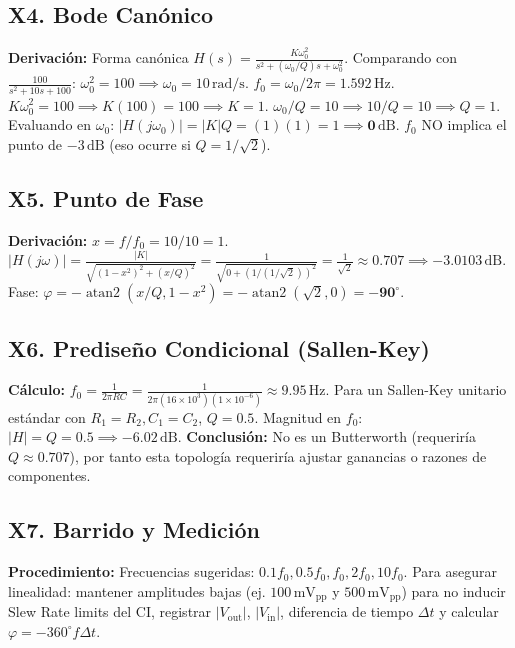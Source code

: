 \documentclass[10pt, a4paper]{article}
\begin{document}
\subsection*{X4. Bode Canónico}
\textbf{Derivación:} Forma canónica $H(s) = \frac{K\omega_0^2}{s^2 + (\omega_0/Q)s + \omega_0^2}$. Comparando con $\frac{100}{s^2 + 10s + 100}$:
$\omega_0^2 = 100 \implies \omega_0 = 10\,\mathrm{rad/s}$. $f_0 = \omega_0 / 2\pi = 1.592\,\mathrm{Hz}$.
$K\omega_0^2 = 100 \implies K(100) = 100 \implies K = 1$.
$\omega_0/Q = 10 \implies 10/Q = 10 \implies Q = 1$.
Evaluando en $\omega_0$: $|H(j\omega_0)| = |K|Q = (1)(1) = 1 \implies \mathbf{0\,\mathrm{dB}}$. $f_0$ NO implica el punto de $-3\,\mathrm{dB}$ (eso ocurre si $Q=1/\sqrt{2}$).

\subsection*{X5. Punto de Fase}
\textbf{Derivación:} $x = f/f_0 = 10/10 = 1$.
$|H(j\omega)| = \frac{|K|}{\sqrt{(1-x^2)^2 + (x/Q)^2}} = \frac{1}{\sqrt{0 + (1/(1/\sqrt{2}))^2}} = \frac{1}{\sqrt{2}} \approx 0.707 \implies \mathbf{-3.0103\,\mathrm{dB}}$.
Fase: $\varphi = -\operatorname{atan2}(x/Q, 1-x^2) = -\operatorname{atan2}(\sqrt{2}, 0) = \mathbf{-90^\circ}$.

\subsection*{X6. Prediseño Condicional (Sallen-Key)}
\textbf{Cálculo:} $f_0 = \frac{1}{2\pi R C} = \frac{1}{2\pi (16\times 10^3)(1\times 10^{-6})} \approx \mathbf{9.95\,\mathrm{Hz}}$.
Para un Sallen-Key unitario estándar con $R_1=R_2, C_1=C_2$, $Q = \mathbf{0.5}$.
Magnitud en $f_0$: $|H| = Q = 0.5 \implies \mathbf{-6.02\,\mathrm{dB}}$. \textbf{Conclusión:} No es un Butterworth (requeriría $Q \approx 0.707$), por tanto esta topología requeriría ajustar ganancias o razones de componentes.

\subsection*{X7. Barrido y Medición}
\textbf{Procedimiento:} Frecuencias sugeridas: $0.1f_0, 0.5f_0, f_0, 2f_0, 10f_0$. Para asegurar linealidad: mantener amplitudes bajas (ej. $100\,\mathrm{mV_{pp}}$ y $500\,\mathrm{mV_{pp}}$) para no inducir Slew Rate limits del CI, registrar $|V_{\mathrm{out}}|$, $|V_{\mathrm{in}}|$, diferencia de tiempo $\Delta t$ y calcular $\varphi = -360^\circ f \Delta t$.
\end{document}

